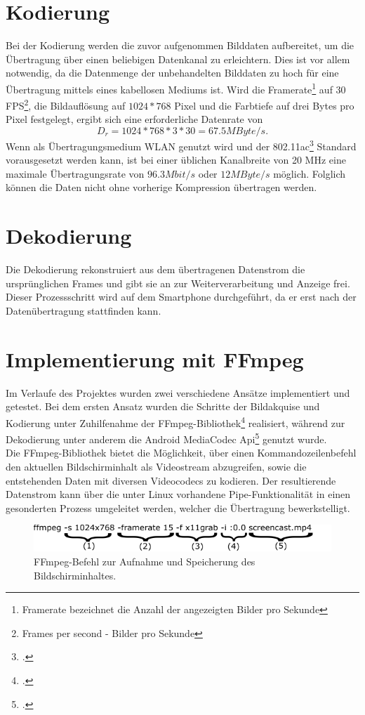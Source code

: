 \section{Kodierung}
Bei der Kodierung werden die zuvor aufgenommen Bilddaten aufbereitet, um die Übertragung über einen beliebigen Datenkanal zu erleichtern. Dies ist vor allem notwendig, da die Datenmenge der unbehandelten Bilddaten zu hoch für eine Übertragung mittels eines kabellosen Mediums ist.  Wird die Framerate\footnote{Framerate bezeichnet die Anzahl der angezeigten Bilder pro Sekunde} auf 30 FPS\footnote{Frames per second - Bilder pro Sekunde}, die Bildauflösung auf $1024*768$ Pixel und die Farbtiefe auf drei Bytes pro Pixel festgelegt, ergibt sich eine erforderliche Datenrate von
\begin{equation}
D_r=1024*768*3*30=67.5 MByte/s.
\end{equation}
Wenn als Übertragungsmedium WLAN genutzt wird und der 802.11ac\footcite{WIFIStandard} Standard vorausgesetzt werden kann, ist bei einer üblichen Kanalbreite von 20 MHz eine maximale Übertragungsrate von $96.3 Mbit/s$ oder $12 MByte/s$ möglich. Folglich können die Daten nicht ohne vorherige Kompression übertragen werden.

\section{Dekodierung}
Die Dekodierung rekonstruiert aus dem übertragenen Datenstrom die ursprünglichen Frames und gibt sie an zur Weiterverarbeitung und Anzeige frei. Dieser Prozessschritt wird auf dem Smartphone durchgeführt, da er erst nach der Datenübertragung stattfinden kann.

\section{Implementierung mit FFmpeg} \label{ImplFFmpeg}
Im Verlaufe des Projektes wurden zwei verschiedene Ansätze implementiert und getestet. Bei dem ersten Ansatz wurden die Schritte der Bildakquise und Kodierung unter Zuhilfenahme der FFmpeg-Bibliothek\footcite{FFmpeg} realisiert, während zur Dekodierung unter anderem die Android MediaCodec Api\footcite{AndroidMediaCodec} genutzt wurde.\\
Die FFmpeg-Bibliothek bietet die Möglichkeit, über einen Kommandozeilenbefehl den aktuellen Bildschirminhalt als Videostream abzugreifen, sowie die entstehenden Daten mit diversen Videocodecs zu kodieren. Der resultierende Datenstrom kann über die unter Linux vorhandene Pipe-Funktionalität in einen gesonderten Prozess umgeleitet werden, welcher die Übertragung bewerkstelligt.\\
\begin{figure}[H]
	\includegraphics[width=1\textwidth]{Bilder/BildakquiseUndDatenaufbereitung/ffmpeg_befehl1.pdf}
	\caption{FFmpeg-Befehl zur Aufnahme und Speicherung des Bildschirminhaltes.}
	\label{fig:FFmpeg_befehl1}
\end{figure}


